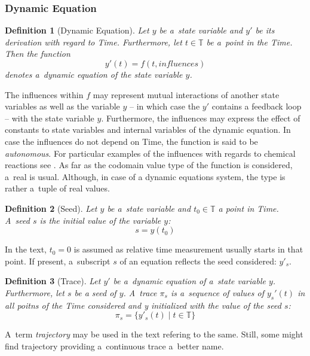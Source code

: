\documentclass[12pt,oneside,draft]{fithesis}
\newcommand{\mTime}{\mathbb{T}}
\newtheorem{mydef}{Definition}
\begin{document}
\subsubsection{Dynamic Equation}
\begin{mydef}[Dynamic Equation]
Let $y$ be a~state variable and $y'$ be its derivation with regard to
Time. Furthermore, let $t \in \mTime$ be a~point in the Time.
Then the function
	\begin{equation}
		y'(t)=f(t, influences)
	\end{equation}
denotes a~dynamic equation of the state variable $y$.
\end{mydef}
The influences within $f$ may represent mutual interactions of another
state variables as well as the variable $y$ -- in which case the
$y'$ contains a feedback loop -- with the state variable $y$.
Furthermore, the influences may express the effect of constants to
state variables and internal variables of the dynamic equation. In case
the influences do not depend on Time, the function is said to be
\emph{autonomous}.
For particular examples of the influences with regards to
chemical reactions see \cite{sven}.
As far as the codomain value type of the function is considered, a~real
is usual. Although, in case of a dynamic equations system, the
type is rather a~tuple of real values.

\begin{mydef}[Seed]
Let $y$ be a~state variable and $t_0 \in \mTime$ a point in Time.
A~seed $s$ is the initial value of the variable $y$:
	\begin{equation}
		s=y(t_0)
	\end{equation}
\end{mydef}
In the text, $t_0 = 0$ is assumed as relative time measurement usually
starts in that point. If present, a~subscript $s$ of an equation
reflects the seed considered: $y'_s$.

\begin{mydef}[Trace]
Let $y'$ be a~dynamic equation of a~state variable $y$. Furthermore,
let $s$ be a seed of $y$.
A~trace $\pi_s$ is a~sequence of values of $y_s'(t)$ in all poitns
of the Time considered and y initialized with the value of the seed $s$:
	\begin{equation}
		\pi_s=\{y'_s(t)\mid t\in\mTime\}
	\end{equation}
\end{mydef}
A~term \emph{trajectory} may be used in the text refering to the same.
Still, some might find trajectory providing a~continuous trace a~better
name.
\end{document}
